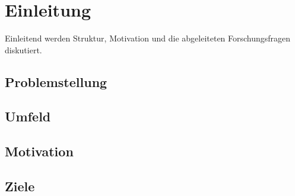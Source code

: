 

\chapter{Einleitung}

Einleitend werden Struktur, Motivation und die abgeleiteten Forschungsfragen diskutiert.

\section{Problemstellung}
\blindtext

\section{Umfeld}
\blindtext

\section{Motivation}
\blindtext

\section{Ziele}
\blindtext